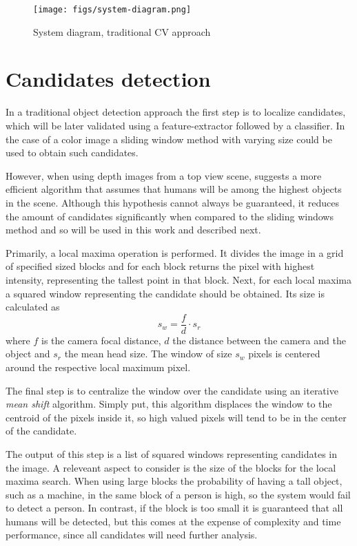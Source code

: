   \begin{figure*}[!t]
  \centering
  \texttt{[image: figs/system-diagram.png]}
  \caption{System diagram, traditional CV approach}
  \label{fig:system-diagram}
  \end{figure*}

\section{Candidates detection}
\label{sec:candidates}

    In a traditional object detection approach \cite{traditional-objdetect} the first step is to localize candidates, which will be later validated using a feature-extractor followed by a classifier. In the case of a color image a sliding window method with varying size could be used to obtain such candidates.

    However, when using depth images from a top view scene, \cite{rauter} suggests a more efficient algorithm that assumes that humans will be among the highest objects in the scene. Although this hypothesis cannot always be guaranteed, it reduces the amount of candidates significantly when compared to the sliding windows method and so will be used in this work and described next.

    Primarily, a local maxima operation is performed. It divides the image in a grid of specified sized blocks and for each block returns the pixel with highest intensity, representing the tallest point in that block. Next, for each local maxima a squared window representing the candidate should be obtained. Its size is calculated as
    \begin{equation}
      s_w = \frac{f}{d} \cdot s_r
    \end{equation}
    where $f$ is the camera focal distance, $d$ the distance between the camera and the object and $s_r$ the mean head size. The window of size $s_w$ pixels is centered around the respective local maximum pixel.

    The final step is to centralize the window over the candidate using an iterative \textit{mean shift} algorithm. Simply put, this algorithm displaces the window to the centroid of the pixels inside it, so high valued pixels will tend to be in the center of the candidate.

    The output of this step is a list of squared windows representing candidates in the image. A releveant aspect to consider is the size of the blocks for the local maxima search. When using large blocks the probability of having a tall object, such as a machine, in the same block of a person is high, so the system would fail to detect a person. In contrast, if the block is too small it is guaranteed that all humans will be detected, but this comes at the expense of complexity and time performance, since all candidates will need further analysis.

